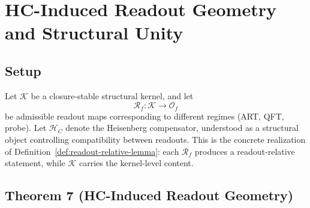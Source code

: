 \section{HC-Induced Readout Geometry and Structural Unity}
\label{sec:theorem7}

\subsection*{Setup}

Let $\mathcal{K}$ be a closure-stable structural kernel, and let
\[
 \mathcal{R}_f : \mathcal{K} \to \mathcal{O}_f
\]
be admissible readout maps corresponding to different regimes (ART,
QFT, probe). Let $\mathcal{H}_C$ denote the Heisenberg compensator,
understood as a structural object controlling compatibility between
readouts. This is the concrete realization of
Definition~\ref{def:readout-relative-lemma}: each $\mathcal{R}_f$
produces a readout-relative statement, while $\mathcal{K}$ carries the
kernel-level content.

\subsection*{Theorem 7 (HC-Induced Readout Geometry)}

